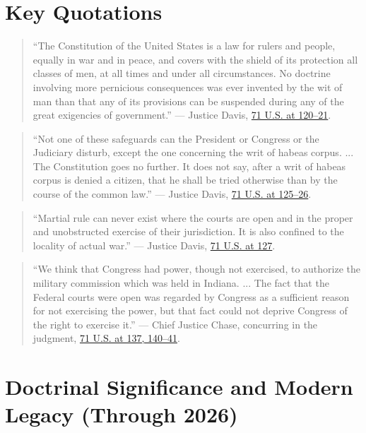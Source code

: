 \documentclass[12pt]{article}
\begin{document}
\section{Key Quotations}

\begin{quote}
``The Constitution of the United States is a law for rulers and people, equally in war and in peace, and covers with the shield of its protection all classes of men, at all times and under all circumstances. No doctrine involving more pernicious consequences was ever invented by the wit of man than that any of its provisions can be suspended during any of the great exigencies of government.'' --- Justice Davis, \href{https://supreme.justia.com/cases/federal/us/71/2/}{71 U.S. at 120--21}.
\end{quote}

\begin{quote}
``Not one of these safeguards can the President or Congress or the Judiciary disturb, except the one concerning the writ of habeas corpus. ... The Constitution goes no further. It does not say, after a writ of habeas corpus is denied a citizen, that he shall be tried otherwise than by the course of the common law.'' --- Justice Davis, \href{https://supreme.justia.com/cases/federal/us/71/2/}{71 U.S. at 125--26}.
\end{quote}

\begin{quote}
``Martial rule can never exist where the courts are open and in the proper and unobstructed exercise of their jurisdiction. It is also confined to the locality of actual war.'' --- Justice Davis, \href{https://supreme.justia.com/cases/federal/us/71/2/}{71 U.S. at 127}.
\end{quote}

\begin{quote}
``We think that Congress had power, though not exercised, to authorize the military commission which was held in Indiana. ... The fact that the Federal courts were open was regarded by Congress as a sufficient reason for not exercising the power, but that fact could not deprive Congress of the right to exercise it.'' --- Chief Justice Chase, concurring in the judgment, \href{https://supreme.justia.com/cases/federal/us/71/2/}{71 U.S. at 137, 140--41}.
\end{quote}

\section{Doctrinal Significance and Modern Legacy (Through 2026)}
\end{document}

